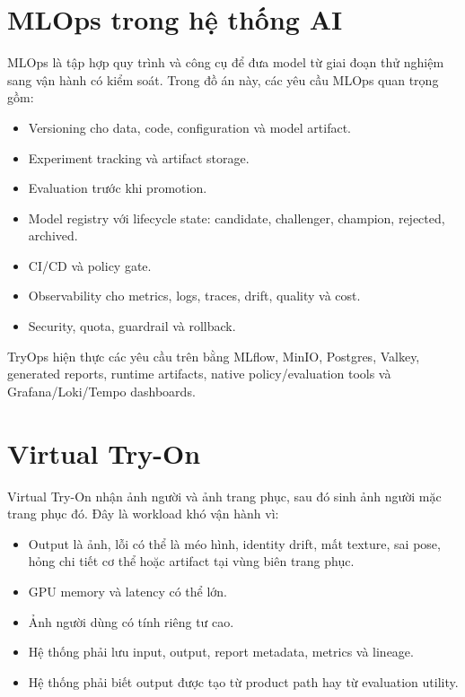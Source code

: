 \documentclass[12pt,a4paper,oneside]{report}
\begin{document}
\section{MLOps trong hệ thống AI}

MLOps là tập hợp quy trình và công cụ để đưa model từ giai đoạn thử nghiệm sang vận hành có kiểm soát. Trong đồ án này, các yêu cầu MLOps quan trọng gồm:

\begin{itemize}
  \item Versioning cho data, code, configuration và model artifact.
  \item Experiment tracking và artifact storage.
  \item Evaluation trước khi promotion.
  \item Model registry với lifecycle state: candidate, challenger, champion, rejected, archived.
  \item CI/CD và policy gate.
  \item Observability cho metrics, logs, traces, drift, quality và cost.
  \item Security, quota, guardrail và rollback.
\end{itemize}

TryOps hiện thực các yêu cầu trên bằng MLflow, MinIO, Postgres, Valkey, generated reports, runtime artifacts, native policy/evaluation tools và Grafana/Loki/Tempo dashboards.

\section{Virtual Try-On}

Virtual Try-On nhận ảnh người và ảnh trang phục, sau đó sinh ảnh người mặc trang phục đó. Đây là workload khó vận hành vì:

\begin{itemize}
  \item Output là ảnh, lỗi có thể là méo hình, identity drift, mất texture, sai pose, hỏng chi tiết cơ thể hoặc artifact tại vùng biên trang phục.
  \item GPU memory và latency có thể lớn.
  \item Ảnh người dùng có tính riêng tư cao.
  \item Hệ thống phải lưu input, output, report metadata, metrics và lineage.
  \item Hệ thống phải biết output được tạo từ product path hay từ evaluation utility.
\end{itemize}
\end{document}

